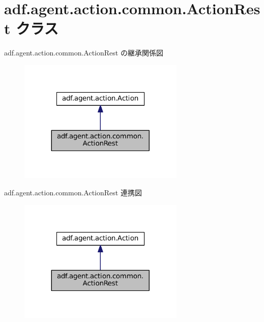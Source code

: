 \hypertarget{classadf_1_1agent_1_1action_1_1common_1_1ActionRest}{}\section{adf.\+agent.\+action.\+common.\+Action\+Rest クラス}
\label{classadf_1_1agent_1_1action_1_1common_1_1ActionRest}


adf.\+agent.\+action.\+common.\+Action\+Rest の継承関係図
\nopagebreak
\begin{figure}[H]
\begin{center}
\leavevmode
\includegraphics[width=224pt]{classadf_1_1agent_1_1action_1_1common_1_1ActionRest__inherit__graph}
\end{center}
\end{figure}


adf.\+agent.\+action.\+common.\+Action\+Rest 連携図
\nopagebreak
\begin{figure}[H]
\begin{center}
\leavevmode
\includegraphics[width=224pt]{classadf_1_1agent_1_1action_1_1common_1_1ActionRest__coll__graph}
\end{center}
\end{figure}
